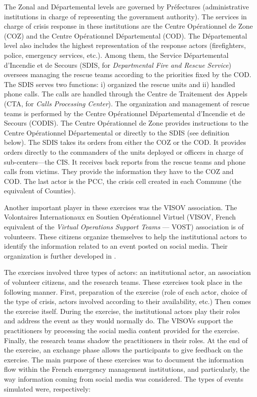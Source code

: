 The Zonal and Départemental levels are governed by Préfectures (administrative institutions in charge of representing the government authority).
The services in charge of crisis response in these institutions are the Centre Opérationnel de Zone (COZ) and the Centre Opérationnel Départemental (COD).
The Départemental level also includes the highest representation of the response actors (firefighters, police, emergency services, etc.).
Among them, the Service Départemental d'Incendie et de Secours (SDIS, for \textit{Departmental Fire and Rescue Service}) oversees managing the rescue teams according to the priorities fixed by the COD.
The SDIS serves two functions: i) organized the rescue units and ii) handled phone calls.
The calls are handled through the Centre de Traitement des Appels (CTA, for \textit{Calls Processing Center}).
The organization and management of rescue teams is performed by the Centre Opérationnel Départemental d’Incendie et de Secours (CODIS).
The Centre Opérationnel de Zone provides instructions to the Centre Opérationnel Départemental or directly to the SDIS (see definition below).
The SDIS takes its orders from either the COZ or the COD.
It provides orders directly to the commanders of the units deployed or officers in charge of sub-centers—the CIS.
It receives back reports from the rescue teams and phone calls from victims.
They provide the information they have to the COZ and COD.
The last actor is the PCC, the crisis cell created in each Commune (the equivalent of Counties).

Another important player in these exercises was the VISOV association.
The Volontaires Internationaux en Soutien Opérationnel Virtuel (VISOV, French equivalent of the \textit{Virtual Operations Support Teams} — VOST) association is of volunteers.
These citizens organize themselves to help the institutional actors to identify the information related to an event posted on social media.
Their organization is further developed in \textcite[p.122--148]{batardIntegrerContributionsCitoyennes2021}.

The exercises involved three types of actors: an institutional actor, an association of volunteer citizens, and the research teams.
These exercises took place in the following manner.
First, preparation of the exercise (role of each actor, choice of the type of crisis, actors involved according to their availability, etc.)
Then comes the exercise itself.
During the exercise, the institutional actors play their roles and address the event as they would normally do.
The VISOVs support the practitioners by processing the social media content provided for the exercise.
Finally, the research teams shadow the practitioners in their roles.
At the end of the exercise, an exchange phase allows the participants to give feedback on the exercise.
The main purpose of these exercises was to document the information flow within the French emergency management institutions, and particularly, the way information coming from social media was considered.
The types of events simulated were, respectively:

